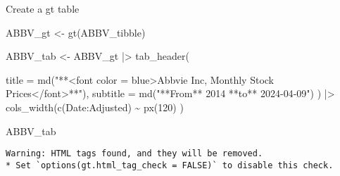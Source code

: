 \documentclass[
  letterpaper,
  DIV=11,
  numbers=noendperiod]{scrartcl}
\newenvironment{Shaded}{\begin{snugshade}}{\end{snugshade}}
\newcommand{\AttributeTok}[1]{\textcolor[rgb]{0.40,0.45,0.13}{#1}}
\newcommand{\DecValTok}[1]{\textcolor[rgb]{0.68,0.00,0.00}{#1}}
\newcommand{\FunctionTok}[1]{\textcolor[rgb]{0.28,0.35,0.67}{#1}}
\newcommand{\NormalTok}[1]{\textcolor[rgb]{0.00,0.23,0.31}{#1}}
\newcommand{\OtherTok}[1]{\textcolor[rgb]{0.00,0.23,0.31}{#1}}
\newcommand{\SpecialCharTok}[1]{\textcolor[rgb]{0.37,0.37,0.37}{#1}}
\newcommand{\StringTok}[1]{\textcolor[rgb]{0.13,0.47,0.30}{#1}}
\begin{document}
Create a gt table

\begin{Shaded}
\begin{Highlighting}[]
\NormalTok{ABBV\_gt }\OtherTok{\textless{}{-}} \FunctionTok{gt}\NormalTok{(ABBV\_tibble) }

\NormalTok{ABBV\_tab }\OtherTok{\textless{}{-}}\NormalTok{ ABBV\_gt }\SpecialCharTok{|\textgreater{}}
 \FunctionTok{tab\_header}\NormalTok{(}
  
    \AttributeTok{title =} \FunctionTok{md}\NormalTok{(}\StringTok{"**\textless{}font color = blue\textgreater{}Abbvie Inc, Monthly Stock Prices\textless{}/font\textgreater{}**"}\NormalTok{),}
    \AttributeTok{subtitle =} \FunctionTok{md}\NormalTok{(}\StringTok{"**From** 2014 **to** 2024{-}04{-}09"}\NormalTok{)}
\NormalTok{ ) }\SpecialCharTok{|\textgreater{}} 
 \FunctionTok{cols\_width}\NormalTok{(}\FunctionTok{c}\NormalTok{(Date}\SpecialCharTok{:}\NormalTok{Adjusted)  }\SpecialCharTok{\textasciitilde{}} \FunctionTok{px}\NormalTok{(}\DecValTok{120}\NormalTok{)}
\NormalTok{  )}

\NormalTok{ABBV\_tab}
\end{Highlighting}
\end{Shaded}

\begin{verbatim}
Warning: HTML tags found, and they will be removed.
* Set `options(gt.html_tag_check = FALSE)` to disable this check.
\end{verbatim}
\end{document}
